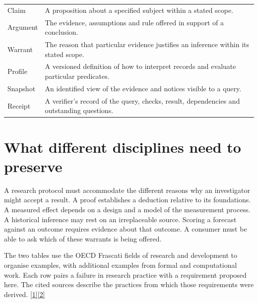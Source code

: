 \documentclass[11pt,a4paper]{article}
\newcommand{\partpage}[1]{\clearpage\section{#1}}
\newcommand{\topic}[1]{\par\smallskip{\sffamily\bfseries\color{ink}#1\par}\nobreak}
\newcommand{\src}[1]{\hyperlink{ref#1}{[#1]}}
\begin{document}
\clearpage
{}
{\small\setlength{\parskip}{0pt}\tableofcontents}

\topic{Key terms}
\begin{tabularx}{\linewidth}{@{}L{.19\linewidth}Y@{}}
Claim & A proposition about a specified subject within a stated scope. \\
Argument & The evidence, assumptions and rule offered in support of a conclusion. \\
Warrant & The reason that particular evidence justifies an inference within its stated scope. \\
Profile & A versioned definition of how to interpret records and evaluate particular predicates. \\
Snapshot & An identified view of the evidence and notices visible to a query. \\
Receipt & A verifier's record of the query, checks, result, dependencies and outstanding questions. \\
\end{tabularx}

\partpage{What different disciplines need to preserve}
A research protocol must accommodate the different reasons why an investigator might accept a result. A proof establishes a deduction relative to its foundations. A measured effect depends on a design and a model of the measurement process. A historical inference may rest on an irreplaceable source. Scoring a forecast against an outcome requires evidence about that outcome. A consumer must be able to ask which of these warrants is being offered.

The two tables use the OECD Frascati fields of research and development to organise examples, with additional examples from formal and computational work. Each row pairs a failure in research practice with a requirement proposed here. The cited sources describe the practices from which those requirements were derived. \src{1}\src{2}
\end{document}
